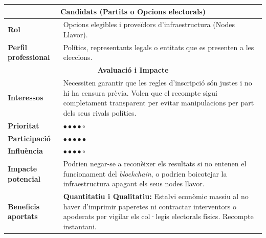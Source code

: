 \begin{table}[H]
\centering
\renewcommand{\arraystretch}{1.5}
\begin{tabularx}{\textwidth}{|l|X|}
\hline
\multicolumn{2}{|c|}{\textbf{Candidats (Partits o Opcions electorals)}} \\ \hline
\textbf{Rol} & Opcions elegibles i proveïdors d'infraestructura (Nodes Llavor). \\ \hline
\textbf{Perfil professional} & Polítics, representants legals o entitats que es presenten a les eleccions. \\ \hline
\multicolumn{2}{|c|}{\textbf{Avaluació i Impacte}} \\ \hline
\textbf{Interessos} & Necessiten garantir que les regles d'inscripció són justes i no hi ha censura prèvia. Volen que el recompte sigui completament transparent per evitar manipulacions per part dels seus rivals polítics. \\ \hline
\textbf{Prioritat} & \(\bullet \bullet \bullet \bullet \circ\) \\ \hline
\textbf{Participació} & \(\bullet \bullet \bullet \bullet \bullet\) \\ \hline
\textbf{Influència} & \(\bullet \bullet \bullet \bullet \circ\) \\ \hline
\textbf{Impacte potencial} & Podrien negar-se a reconèixer els resultats si no entenen el funcionament del \textit{blockchain}, o podrien boicotejar la infraestructura apagant els seus nodes llavor. \\ \hline
\textbf{Beneficis aportats} & \textbf{Quantitatiu i Qualitatiu:} Estalvi econòmic massiu al no haver d'imprimir paperetes ni contractar interventors o apoderats per vigilar els col·legis electorals físics. Recompte instantani. \\ \hline
\end{tabularx}
\end{table}

\vspace{0.5cm}


